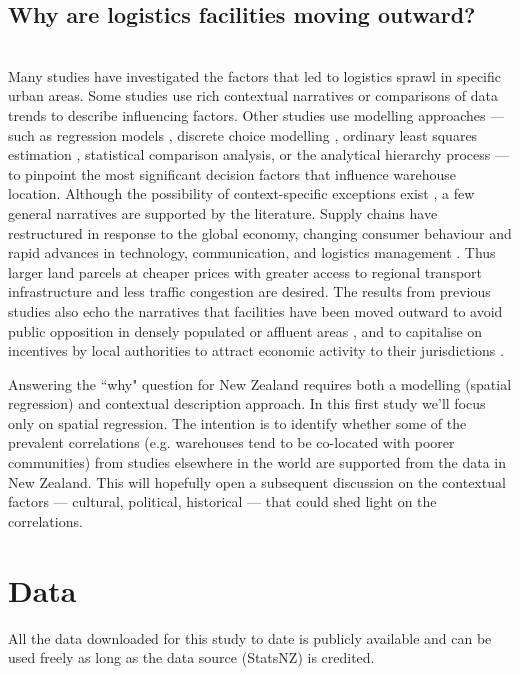 \documentclass[3p, a4paper, authoryear, 11pt, fleqn, review]{elsarticle}
\newcommand{\nmt}[1]{{\color{Maroon}{~(nmt: #1)}}}
\begin{document}
\subsection{Why are logistics facilities moving outward?}
\nmt{Draft from manuscript for the Journal of Transport Geography. It must be paraphrased / updated later.}\\
Many studies have investigated the factors that led to logistics sprawl in specific urban areas. Some studies use rich contextual narratives \citep{DablancRakotonarivo2010, He_etal2019,Strale2020} or comparisons of data trends \citep{Sakai_etal2016} to describe influencing factors. Other studies use modelling approaches --- such as regression models \citep{Cidell2010, LimPark2020}, discrete choice modelling \citep{Kang2020b}, ordinary least squares estimation \citep{Kang2020c}, statistical comparison analysis, or the analytical hierarchy process --- to pinpoint the most significant decision factors that influence warehouse location. Although the possibility of context-specific exceptions exist \citep{Cidell2010,Kang2020c}, a few general narratives are supported by the literature. Supply chains have restructured in response to the global economy, changing consumer behaviour and rapid advances in technology, communication, and logistics management \citep{Kang2020, Sakai_etal2015, Sakai_etal2017}. Thus larger land parcels at cheaper prices with greater access to regional transport infrastructure and less traffic congestion are desired. The results from previous studies also echo the narratives that facilities have been moved outward to avoid public opposition in densely populated or affluent areas \citep{He_etal2019, Strale2020, Yuan2018}, and to capitalise on incentives by local authorities to attract economic activity to their jurisdictions \citep{Strale2020}. 

Answering the ``why" question for New Zealand requires both a modelling (spatial regression) and contextual description approach. In this first study we'll focus only on spatial regression. The intention is to identify whether some of the prevalent correlations (e.g. warehouses tend to be co-located with poorer communities) from studies elsewhere in the world are supported from the data in New Zealand. This will hopefully open a subsequent discussion on the contextual factors --- cultural, political, historical --- that could shed light on the correlations. 

\section{Data}
All the data downloaded for this study to date is publicly available and can be used freely as long as the data source (StatsNZ) is credited. 
\end{document}
